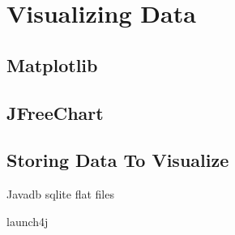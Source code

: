 \chapter{Visualizing Data}
\section{Matplotlib}
\section{JFreeChart}
\section{Storing Data To Visualize}
Javadb
sqlite
flat files

launch4j
